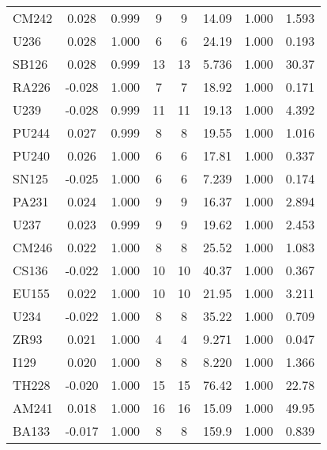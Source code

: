 \begin{tabular}{|l|ccccccc|}
CM242 & 0.028 & 0.999 & 9 & 9 & 14.09 & 1.000 & 1.593\\
U236 & 0.028 & 1.000 & 6 & 6 & 24.19 & 1.000 & 0.193\\
SB126 & 0.028 & 0.999 & 13 & 13 & 5.736 & 1.000 & 30.37\\
RA226 & -0.028 & 1.000 & 7 & 7 & 18.92 & 1.000 & 0.171\\
U239 & -0.028 & 0.999 & 11 & 11 & 19.13 & 1.000 & 4.392\\
PU244 & 0.027 & 0.999 & 8 & 8 & 19.55 & 1.000 & 1.016\\
PU240 & 0.026 & 1.000 & 6 & 6 & 17.81 & 1.000 & 0.337\\
SN125 & -0.025 & 1.000 & 6 & 6 & 7.239 & 1.000 & 0.174\\
PA231 & 0.024 & 1.000 & 9 & 9 & 16.37 & 1.000 & 2.894\\
U237 & 0.023 & 0.999 & 9 & 9 & 19.62 & 1.000 & 2.453\\
CM246 & 0.022 & 1.000 & 8 & 8 & 25.52 & 1.000 & 1.083\\
CS136 & -0.022 & 1.000 & 10 & 10 & 40.37 & 1.000 & 0.367\\
EU155 & 0.022 & 1.000 & 10 & 10 & 21.95 & 1.000 & 3.211\\
U234 & -0.022 & 1.000 & 8 & 8 & 35.22 & 1.000 & 0.709\\
ZR93 & 0.021 & 1.000 & 4 & 4 & 9.271 & 1.000 & 0.047\\
I129 & 0.020 & 1.000 & 8 & 8 & 8.220 & 1.000 & 1.366\\
TH228 & -0.020 & 1.000 & 15 & 15 & 76.42 & 1.000 & 22.78\\
AM241 & 0.018 & 1.000 & 16 & 16 & 15.09 & 1.000 & 49.95\\
BA133 & -0.017 & 1.000 & 8 & 8 & 159.9 & 1.000 & 0.839\\
\hline
\end{tabular}